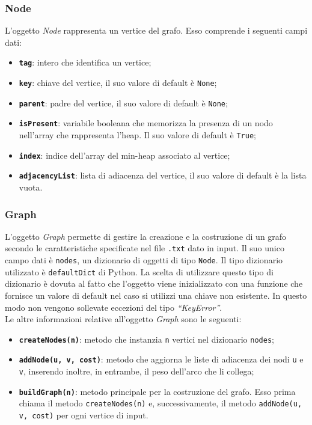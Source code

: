	\subsubsection{Node}
	L'oggetto \textit{Node} rappresenta un vertice del grafo. 
	Esso comprende i seguenti campi dati:
	\begin{itemize}
		\item \texttt{\textbf{tag}}: intero che identifica un vertice;
		\item \texttt{\textbf{key}}: chiave del vertice, il suo valore di default è \texttt{None};
		\item \texttt{\textbf{parent}}: padre del vertice, il suo valore di default è \texttt{None};
		\item \texttt{\textbf{isPresent}}: variabile booleana che memorizza la presenza di un nodo nell'array che rappresenta l'heap. Il suo valore di default è \texttt{True};
		\item \texttt{\textbf{index}}: indice dell'array del min-heap associato al vertice; 
		\item \texttt{\textbf{adjacencyList}}: lista di adiacenza del vertice, il suo valore di default è la lista vuota.
	\end{itemize}
	
	\subsubsection{Graph}
		L'oggetto \textit{Graph} permette di gestire la creazione e la costruzione di un grafo secondo le caratteristiche specificate nel file \texttt{.txt} dato in input. 
		Il suo unico campo dati è \texttt{nodes}, un dizionario di oggetti di tipo \texttt{Node}. 
		Il tipo dizionario utilizzato è \texttt{defaultDict} di Python. 
		La scelta di utilizzare questo tipo di dizionario è dovuta al fatto che l'oggetto viene inizializzato con una funzione che fornisce un valore di default nel caso si utilizzi una chiave non esistente. 
		In questo modo non vengono sollevate eccezioni del tipo \textit{``KeyError''}.\\
		Le altre informazioni relative all'oggetto \emph{Graph} sono le seguenti:
		\begin{itemize}
			\item \texttt{\textbf{createNodes(n)}}: metodo che instanzia \texttt{n} vertici nel dizionario \texttt{nodes};
			\item \texttt{\textbf{addNode(u, v, cost)}}: metodo che aggiorna le liste di adiacenza dei nodi \texttt{u} e \texttt{v}, inserendo inoltre, in entrambe, il peso dell'arco che li collega;
			\item \texttt{\textbf{buildGraph(n)}}: metodo principale per la costruzione del grafo. Esso prima chiama il metodo \texttt{createNodes(n)}  e, successivamente, il metodo \texttt{addNode(u, v, cost)} per ogni vertice di input.
		\end{itemize}

